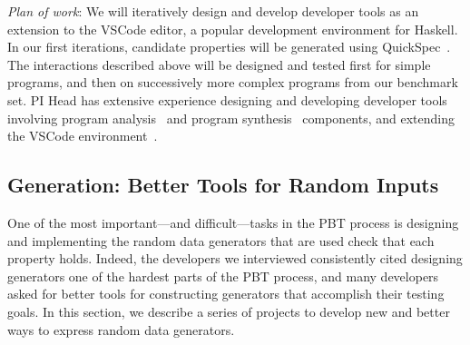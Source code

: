 \textit{Plan of work}: We will iteratively design and develop developer tools as
an extension to the VSCode editor, a popular development environment for
Haskell. In our first iterations, candidate properties will be generated using
QuickSpec~\cite{claessen2010quickspec}. The interactions described above will be
designed and tested first for simple programs, and then on successively more
complex programs from our benchmark set. PI Head has extensive experience
designing and developing developer tools involving program
analysis~\cite{head2018interactive,head2019managing} and program
synthesis~\cite{head2017writing} components, and extending the VSCode
environment~\cite{head2020composing}.   

\subsection{Generation: Better Tools for Random Inputs }\label{sec:gen}

One of the most important---and difficult---tasks in the PBT process is
designing and implementing the random data generators that are used check that
each property holds. Indeed, the developers we interviewed consistently
cited designing generators one of the hardest parts of the PBT process, and many
developers asked for better tools for constructing generators that accomplish
their testing goals. In this section, we describe a series of projects
to develop new and better ways to express random data generators.

